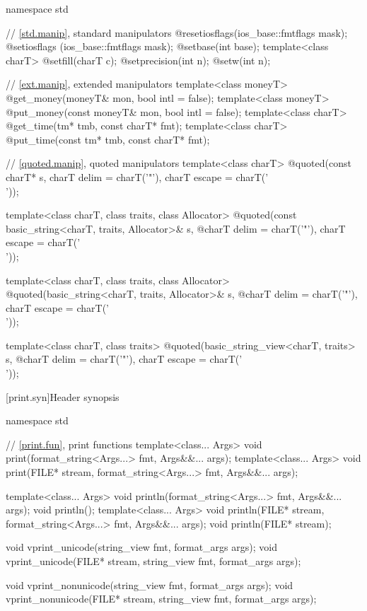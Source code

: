 %
\begin{codeblock}
namespace std {
  // \ref{std.manip}, standard manipulators
  @\unspec@ resetiosflags(ios_base::fmtflags mask);
  @\unspec@ setiosflags  (ios_base::fmtflags mask);
  @\unspec@ setbase(int base);
  template<class charT> @\unspec@ setfill(charT c);
  @\unspec@ setprecision(int n);
  @\unspec@ setw(int n);

  // \ref{ext.manip}, extended manipulators
  template<class moneyT> @\unspec@ get_money(moneyT& mon, bool intl = false);
  template<class moneyT> @\unspec@ put_money(const moneyT& mon, bool intl = false);
  template<class charT> @\unspec@ get_time(tm* tmb, const charT* fmt);
  template<class charT> @\unspec@ put_time(const tm* tmb, const charT* fmt);

  // \ref{quoted.manip}, quoted manipulators
  template<class charT>
    @\unspec@ quoted(const charT* s, charT delim = charT('"'), charT escape = charT('\\'));

  template<class charT, class traits, class Allocator>
    @\unspec@ quoted(const basic_string<charT, traits, Allocator>& s,
    @\itcorr@                   charT delim = charT('"'), charT escape = charT('\\'));

  template<class charT, class traits, class Allocator>
    @\unspec@ quoted(basic_string<charT, traits, Allocator>& s,
    @\itcorr@                   charT delim = charT('"'), charT escape = charT('\\'));

  template<class charT, class traits>
    @\unspec@ quoted(basic_string_view<charT, traits> s,
    @\itcorr@                   charT delim = charT('"'), charT escape = charT('\\'));
}
\end{codeblock}

[print.syn]{Header  synopsis}

%
\begin{codeblock}
namespace std {
  // \ref{print.fun}, print functions
  template<class... Args>
    void print(format_string<Args...> fmt, Args&&... args);
  template<class... Args>
    void print(FILE* stream, format_string<Args...> fmt, Args&&... args);

  template<class... Args>
    void println(format_string<Args...> fmt, Args&&... args);
  void println();
  template<class... Args>
    void println(FILE* stream, format_string<Args...> fmt, Args&&... args);
  void println(FILE* stream);

  void vprint_unicode(string_view fmt, format_args args);
  void vprint_unicode(FILE* stream, string_view fmt, format_args args);

  void vprint_nonunicode(string_view fmt, format_args args);
  void vprint_nonunicode(FILE* stream, string_view fmt, format_args args);
}
\end{codeblock}

